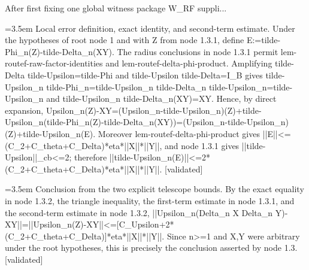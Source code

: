 \documentclass{article}
\newcommand{\step}[1]{\par\noindent\hangindent=3.5em\hangafter=1%
  \makebox[3.5em][l]{\textbf{#1.}}}
\newcommand{\steptag}[1]{\hfill{\small\textsf{[#1]}}}
\begin{document}
\begin{proofbox}{After first fixing one global witness package W\_RF suppli...}
\step{1.3.2} Local error definition, exact identity, and second-term estimate. Under the hypotheses of root node 1 and with Z from node 1.3.1, define E:=tilde-Phi\_n(Z)-tilde-Delta\_n(XY). The radius conclusions in node 1.3.1 permit lem-routef-raw-factor-identities and lem-routef-delta-phi-product. Amplifying tilde-Delta tilde-Upsilon=tilde-Phi and tilde-Upsilon tilde-Delta=I\_B gives tilde-Upsilon\_n tilde-Phi\_n=tilde-Upsilon\_n tilde-Delta\_n tilde-Upsilon\_n=tilde-Upsilon\_n and tilde-Upsilon\_n tilde-Delta\_n(XY)=XY. Hence, by direct expansion, Upsilon\_n(Z)-XY=(Upsilon\_n-tilde-Upsilon\_n)(Z)+tilde-Upsilon\_n(tilde-Phi\_n(Z)-tilde-Delta\_n(XY))=(Upsilon\_n-tilde-Upsilon\_n)(Z)+tilde-Upsilon\_n(E). Moreover lem-routef-delta-phi-product gives ||E||<=(C\_2+C\_theta+C\_Delta)*eta*||X||*||Y||, and node 1.3.1 gives ||tilde-Upsilon||\_cb<=2; therefore ||tilde-Upsilon\_n(E)||<=2*(C\_2+C\_theta+C\_Delta)*eta*||X||*||Y||. \steptag{validated} \\[4pt]
\step{1.3.3} Conclusion from the two explicit telescope bounds. By the exact equality in node 1.3.2, the triangle inequality, the first-term estimate in node 1.3.1, and the second-term estimate in node 1.3.2, ||Upsilon\_n(Delta\_n X Delta\_n Y)-XY||=||Upsilon\_n(Z)-XY||<=[C\_Upsilon+2*(C\_2+C\_theta+C\_Delta)]*eta*||X||*||Y||. Since n>=1 and X,Y were arbitrary under the root hypotheses, this is precisely the conclusion asserted by node 1.3. \steptag{validated} \\[4pt]
\end{proofbox}
\end{document}
